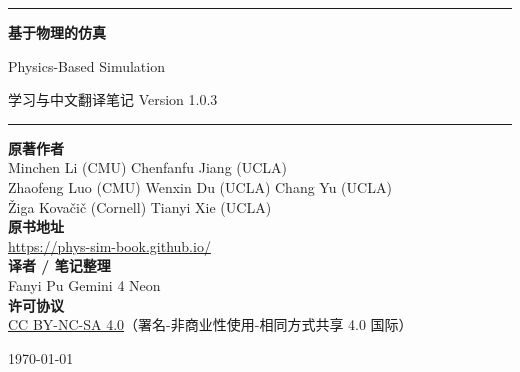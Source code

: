 \documentclass[UTF8,a4paper,11pt,oneside,openany]{ctexbook}
\begin{document}
\begin{titlepage}
  \centering
  \vspace*{2.6cm}
  {\color{AcademicRule}\rule{0.75\textwidth}{0.6pt}\par}
  \vspace{1.2cm}
  {\Huge\bfseries 基于物理的仿真\par}
  \vspace{0.55cm}
  {\Large\rmfamily Physics-Based Simulation\par}
  \vspace{0.55cm}
  {\normalsize\color{AcademicMuted} 学习与中文翻译笔记 \quad\textbar\quad Version 1.0.3\par}
  \vspace{1.2cm}
  {\color{AcademicRule}\rule{0.75\textwidth}{0.6pt}\par}

  \vspace{2.4cm}

  \begin{minipage}{0.82\textwidth}
    \centering
    \small\color{AcademicMuted}
    \textbf{\color{black}原著作者}\\[0.45em]
    Minchen Li (CMU) \quad Chenfanfu Jiang (UCLA)\\
    Zhaofeng Luo (CMU) \quad Wenxin Du (UCLA) \quad Chang Yu (UCLA)\\
    Žiga Kovačič (Cornell) \quad Tianyi Xie (UCLA)\\[1.3em]
    \textbf{\color{black}原书地址}\\[0.35em]
    \url{https://phys-sim-book.github.io/}\\[1.3em]
    \textbf{\color{black}译者 / 笔记整理}\\[0.35em]
    Fanyi Pu \quad Gemini 4 Neon\\[1.3em]
    \textbf{\color{black}许可协议}\\[0.35em]
    \href{https://creativecommons.org/licenses/by-nc-sa/4.0/}{CC BY-NC-SA 4.0}（署名-非商业性使用-相同方式共享 4.0 国际）
  \end{minipage}

  \vfill
  {\small\color{AcademicMuted}\today\par}
\end{titlepage}

\frontmatter
\tableofcontents
\end{document}
